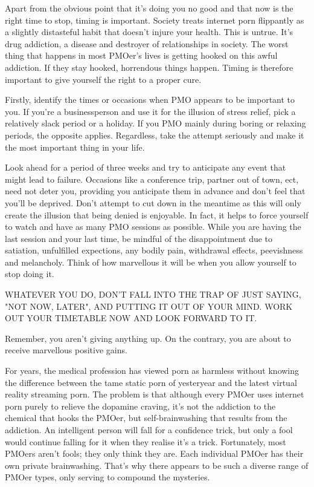 \documentclass[easypeasy.tex]{subfiles}
\begin{document}
Apart from the obvious point that it's doing you no good and that now is the right time to stop, timing is important. Society treats internet porn flippantly as a slightly distasteful habit that doesn't injure your health. This is untrue. It's drug addiction, a disease and destroyer of relationships in society. The worst thing that happens in most PMOer's lives is getting hooked on this awful addiction. If they stay hooked, horrendous things happen. Timing is therefore important to give yourself the right to a proper cure.

Firstly, identify the times or occasions when PMO appears to be important to you. If you're a businessperson and use it for the illusion of stress relief, pick a relatively slack period or a holiday. If you PMO mainly during boring or relaxing periods, the opposite applies. Regardless, take the attempt seriously and make it the most important thing in your life.

Look ahead for a period of three weeks and try to anticipate any event that might lead to failure. Occasions like a conference trip, partner out of town, ect, need not deter you, providing you anticipate them in advance and don't feel that you'll be deprived. Don't attempt to cut down in the meantime as this will only create the illusion that being denied is enjoyable. In fact, it helps to force yourself to watch and have as many PMO sessions as possible. While you are having the last session and your last time, be mindful of the disappointment due to satiation, unfulfilled expections, any bodily pain, withdrawal effects, peevishness and melancholy. Think of how marvellous it will be when you allow yourself to stop doing it.

{\large WHATEVER YOU DO, DON'T FALL INTO THE TRAP OF JUST SAYING, "NOT NOW, LATER", AND PUTTING IT OUT OF YOUR MIND. WORK OUT YOUR TIMETABLE NOW AND LOOK FORWARD TO IT.}

Remember, you aren't giving anything up. On the contrary, you are about to receive marvellous positive gains.

For years, the medical profession has viewed porn as harmless without knowing the difference between the tame static porn of yesteryear and the latest virtual reality streaming porn. The problem is that although every PMOer uses internet porn purely to relieve the dopamine craving, it's not the addiction to the chemical that hooks the PMOer, but self-brainwashing that results from the addiction. An intelligent person will fall for a confidence trick, but only a fool would continue falling for it when they realise it's a trick. Fortunately, most PMOers aren't fools; they only think they are. Each individual PMOer has their own private brainwashing. That's why there appears to be such a diverse range of PMOer types, only serving to compound the mysteries.
\end{document}
